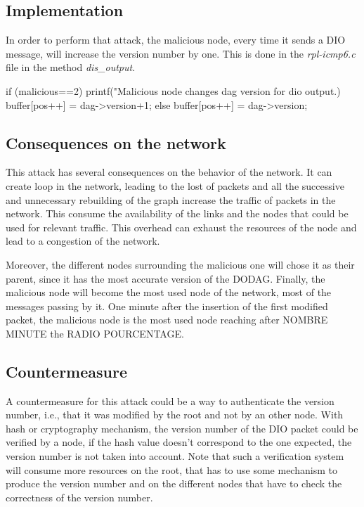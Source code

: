 \documentclass{report}
\begin{document}
\subsection*{Implementation}
In order to perform that attack, the malicious node, every time it sends
a DIO message, will increase the version number by one. This is done in
the \textit{rpl-icmp6.c} file in the method \textit{dis\_output}.

\begin{myc}
if (malicious==2){
    printf("Malicious node changes dag version for dio output.) %
	buffer[pos++] = dag->version+1;
} else {
	buffer[pos++] = dag->version;
}
\end{myc}

\subsection*{Consequences on the network}
This attack has several consequences on the behavior of the network. It
can create loop in the network, leading to the lost of packets and all
the successive and unnecessary rebuilding of the graph increase the
traffic of packets in the network. This consume the availability of the
links and the nodes that could be used for relevant traffic. This
overhead can exhaust the resources of the node and lead to a congestion
of the network. 

Moreover, the different nodes surrounding the malicious one will chose
it as their parent, since it has the most accurate version of the DODAG.
Finally, the malicious node will become the most used node of the
network, most of the messages passing by it. One minute after the
insertion of the first modified packet, the malicious node is the most
used node reaching after NOMBRE MINUTE the RADIO POURCENTAGE. 

\subsection*{Countermeasure}
A countermeasure for this attack could be a way to authenticate the
version number, i.e., that it was modified by the root and not by an
other node. With hash or cryptography mechanism, the version number of
the DIO packet could be verified by a node, if the hash value doesn't
correspond to the one expected, the version number is not taken into
account. Note that such a verification system will consume more
resources on the root, that has to use some mechanism to produce the
version number and on the different nodes that have to check the
correctness of the version number.
\end{document}
